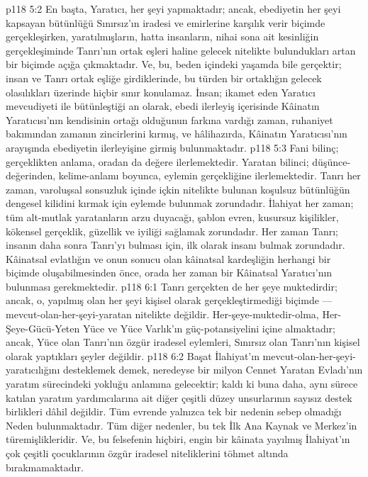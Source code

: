 \vs p118 5:2 En başta, Yaratıcı, her şeyi yapmaktadır; ancak, ebediyetin her şeyi kapsayan bütünlüğü Sınırsız’ın iradesi ve emirlerine karşılık verir biçimde gerçekleşirken, yaratılmışların, hatta insanların, nihai sona ait kesinliğin gerçekleşiminde Tanrı’nın ortak eşleri haline gelecek nitelikte bulundukları artan bir biçimde açığa çıkmaktadır. Ve, bu, beden içindeki yaşamda bile gerçektir; insan ve Tanrı ortak eşliğe girdiklerinde, bu türden bir ortaklığın gelecek olasılıkları üzerinde hiçbir sınır konulamaz. İnsan; ikamet eden Yaratıcı mevcudiyeti ile bütünleştiği an olarak, ebedi ilerleyiş içerisinde Kâinatın Yaratıcısı’nın kendisinin ortağı olduğunun farkına vardığı zaman, ruhaniyet bakımından zamanın zincirlerini kırmış, ve hâlihazırda, Kâinatın Yaratıcısı’nın arayışında ebediyetin ilerleyişine girmiş bulunmaktadır.
\vs p118 5:3 Fani bilinç; gerçeklikten anlama, oradan da değere ilerlemektedir. Yaratan bilinci; düşünce\hyp{}değerinden, kelime\hyp{}anlamı boyunca, eylemin gerçekliğine ilerlemektedir. Tanrı her zaman, varoluşsal sonsuzluk içinde içkin nitelikte bulunan koşulsuz bütünlüğün dengesel kilidini kırmak için eylemde bulunmak zorundadır. İlahiyat her zaman; tüm alt\hyp{}mutlak yaratanların arzu duyacağı, şablon evren, kusursuz kişilikler, kökensel gerçeklik, güzellik ve iyiliği sağlamak zorundadır. Her zaman Tanrı; insanın daha sonra Tanrı’yı bulması için, ilk olarak insanı bulmak zorundadır. Kâinatsal evlatlığın ve onun sonucu olan kâinatsal kardeşliğin herhangi bir biçimde oluşabilmesinden önce, orada her zaman bir Kâinatsal Yaratıcı’nın bulunması gerekmektedir.
\vs p118 6:1 Tanrı gerçekten de her şeye muktedirdir; ancak, o, yapılmış olan her şeyi kişisel olarak gerçekleştirmediği biçimde --- mevcut\hyp{}olan\hyp{}her\hyp{}şeyi\hyp{}yaratan nitelikte değildir. Her\hyp{}şeye\hyp{}muktedir\hyp{}olma, Her\hyp{}Şeye\hyp{}Gücü\hyp{}Yeten Yüce ve Yüce Varlık’ın güç\hyp{}potansiyelini içine almaktadır; ancak, Yüce olan Tanrı’nın özgür iradesel eylemleri, Sınırsız olan Tanrı’nın kişisel olarak yaptıkları şeyler değildir.
\vs p118 6:2 Başat İlahiyat’ın mevcut\hyp{}olan\hyp{}her\hyp{}şeyi\hyp{}yaratıcılığını desteklemek demek, neredeyse bir milyon Cennet Yaratan Evladı’nın yaratım sürecindeki yokluğu anlamına gelecektir; kaldı ki buna daha, aynı sürece katılan yaratım yardımcılarına ait diğer çeşitli düzey unsurlarının sayısız destek birlikleri dâhil değildir. Tüm evrende yalnızca tek bir nedenin sebep olmadığı Neden bulunmaktadır. Tüm diğer nedenler, bu tek İlk Ana Kaynak ve Merkez’in türemişlikleridir. Ve, bu felsefenin hiçbiri, engin bir kâinata yayılmış İlahiyat’ın çok çeşitli çocuklarının özgür iradesel niteliklerini töhmet altında bırakmamaktadır.

